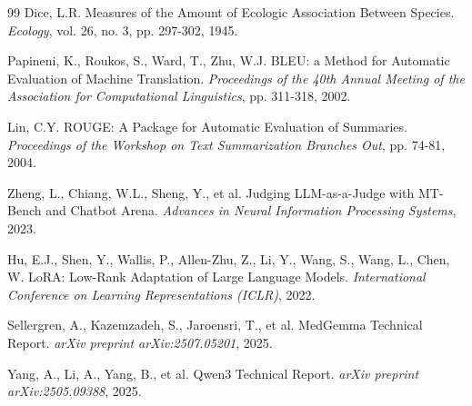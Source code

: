\begin{thebibliography}{99}
         Dice, L.R. Measures of the Amount of Ecologic Association Between Species. \textit{Ecology}, vol. 26, no. 3, pp. 297-302, 1945.

         Papineni, K., Roukos, S., Ward, T., Zhu, W.J. BLEU: a Method for Automatic Evaluation of Machine Translation. \textit{Proceedings of the 40th Annual Meeting of the Association for Computational Linguistics}, pp. 311-318, 2002.

         Lin, C.Y. ROUGE: A Package for Automatic Evaluation of Summaries. \textit{Proceedings of the Workshop on Text Summarization Branches Out}, pp. 74-81, 2004.

         Zheng, L., Chiang, W.L., Sheng, Y., et al. Judging LLM-as-a-Judge with MT-Bench and Chatbot Arena. \textit{Advances in Neural Information Processing Systems}, 2023.
        
         Hu, E.J., Shen, Y., Wallis, P., Allen-Zhu, Z., Li, Y., Wang, S., Wang, L., Chen, W. LoRA: Low-Rank Adaptation of Large Language Models. \textit{International Conference on Learning Representations (ICLR)}, 2022.
        
         Sellergren, A., Kazemzadeh, S., Jaroensri, T., et al. MedGemma Technical Report. \textit{arXiv preprint arXiv:2507.05201}, 2025.
        
         Yang, A., Li, A., Yang, B., et al. Qwen3 Technical Report. \textit{arXiv preprint arXiv:2505.09388}, 2025.
        
    \end{thebibliography} 
